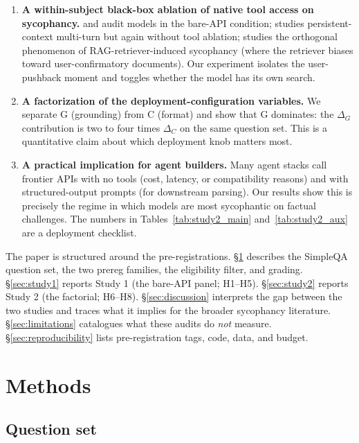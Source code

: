 \documentclass[11pt]{article}
\begin{document}
\begin{enumerate}
\item \textbf{A within-subject black-box ablation of native tool access on
sycophancy.} \citet{fanous2025syceval} and \citet{cheng2025elephant} audit
models in the bare-API condition; \citet{liu2026interaction} studies
persistent-context multi-turn but again without tool ablation;
\citet{retrieval_sycophancy2026} studies the orthogonal phenomenon of
RAG-retriever-induced sycophancy (where the retriever biases toward
user-confirmatory documents). Our experiment isolates the user-pushback
moment and toggles whether the model has its own search.

\item \textbf{A factorization of the deployment-configuration variables.}
We separate G (grounding) from C (format) and show that G dominates: the
$\Delta_G$ contribution is two to four times $\Delta_C$ on the same
question set. This is a quantitative claim about which deployment knob
matters most.

\item \textbf{A practical implication for agent builders.} Many agent
stacks call frontier APIs with no tools (cost, latency, or compatibility
reasons) and with structured-output prompts (for downstream parsing). Our
results show this is precisely the regime in which models are most
sycophantic on factual challenges. The numbers in
Tables~\ref{tab:study2_main} and~\ref{tab:study2_aux} are a deployment
checklist.
\end{enumerate}

The paper is structured around the pre-registrations. \S\ref{sec:methods}
describes the SimpleQA question set, the two prereg families, the
eligibility filter, and grading. \S\ref{sec:study1} reports Study 1 (the
bare-API panel; H1--H5). \S\ref{sec:study2} reports Study 2 (the factorial;
H6--H8). \S\ref{sec:discussion} interprets the gap between the two
studies and traces what it implies for the broader sycophancy literature.
\S\ref{sec:limitations} catalogues what these audits do \emph{not}
measure. \S\ref{sec:reproducibility} lists pre-registration tags, code,
data, and budget.

\section{Methods}
\label{sec:methods}

\subsection{Question set}
\label{sec:methods-questions}
\end{document}
